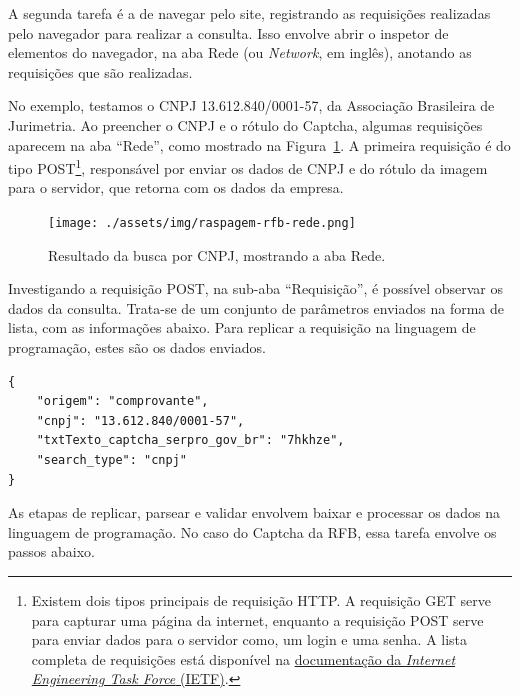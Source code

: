 \documentclass[12pt,twoside,brazilian]{book}
\begin{document}
A segunda tarefa é a de navegar pelo site, registrando as requisições
realizadas pelo navegador para realizar a consulta. Isso envolve abrir o
inspetor de elementos do navegador, na aba Rede (ou \emph{Network}, em
inglês), anotando as requisições que são realizadas.

No exemplo, testamos o CNPJ 13.612.840/0001-57, da Associação Brasileira
de Jurimetria. Ao preencher o CNPJ e o rótulo do Captcha, algumas
requisições aparecem na aba ``Rede'', como mostrado na
Figura~\ref{fig-raspagem-rfb-rede}. A primeira requisição é do tipo
POST\footnote{Existem dois tipos principais de requisição HTTP. A
  requisição GET serve para capturar uma página da internet, enquanto a
  requisição POST serve para enviar dados para o servidor como, um login
  e uma senha. A lista completa de requisições está disponível na
  \href{https://www.rfc-editor.org/rfc/rfc9110.html}{documentação da
  \emph{Internet Engineering Task Force} (IETF)}.}, responsável por
enviar os dados de CNPJ e do rótulo da imagem para o servidor, que
retorna com os dados da empresa.

\begin{figure}

{\centering \texttt{[image: ./assets/img/raspagem-rfb-rede.png]}

}

\caption{\label{fig-raspagem-rfb-rede}Resultado da busca por CNPJ,
mostrando a aba Rede.}

\end{figure}

Investigando a requisição POST, na sub-aba ``Requisição'', é possível
observar os dados da consulta. Trata-se de um conjunto de parâmetros
enviados na forma de lista, com as informações abaixo. Para replicar a
requisição na linguagem de programação, estes são os dados enviados.

\begin{verbatim}
{
    "origem": "comprovante",
    "cnpj": "13.612.840/0001-57",
    "txtTexto_captcha_serpro_gov_br": "7hkhze",
    "search_type": "cnpj"
}
\end{verbatim}

As etapas de replicar, parsear e validar envolvem baixar e processar os
dados na linguagem de programação. No caso do Captcha da RFB, essa
tarefa envolve os passos abaixo.
\end{document}
